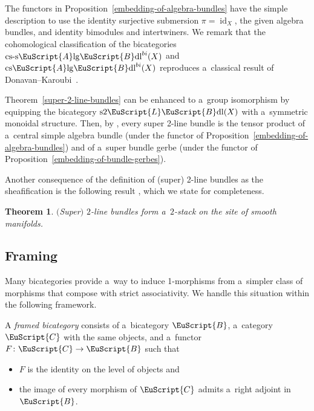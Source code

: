 \documentclass[10pt,a4paper]{amsart}
\numberwithin{equation}{section}
\newtheorem{Theorem}{Theorem}[section]
\def\mathscr#1{\EuScript{#1}}
\newcommand{\id}{\operatorname{id}}
\newcommand{\LineBdl}{\mathscr{L}\mathscr{B}\mathrm{dl}}
\newcommand{\stwoLineBdl}{\mathrm{s}2\LineBdl}
\newcommand{\Alg}{\Incl\mathrm{lg}}
\newcommand{\csAlg}{\mathrm{cs}\Incl\mathrm{lg}}
\newcommand{\cssAlg}{\mathrm{cs\text{-}s}\Alg}
\newcommand{\csAlgBdl}{\csAlg\mathscr{B}\mathrm{dl}}
\newcommand{\cssAlgBdl}{\cssAlg\mathscr{B}\mathrm{dl}}
\newcommand{\Incl}{\mathscr{A}}
\begin{document}
The functors in Proposition~\ref{embedding-of-algebra-bundles} have the simple description to use the identity surjective submersion $\pi=\id_X$, the given algebra bundles, and identity bimodules and intertwiners.
We remark that the cohomological classification of the bicategories $\cssAlgBdl^{bi}(X)$ and $\csAlgBdl^{bi}(X)$ reproduces a~classical result of Donavan--Karoubi~\cite{DK70}.


\begin{Remark}
Theorem~\ref{super-2-line-bundles} can be enhanced to a~group isomorphism by equipping the bicategory $\stwoLineBdl(X)$ with a~symmetric monoidal structure. Then, by \cite[Corollary~4.4.10]{Kristel2020}, every super 2-line bundle is the tensor product of a~central simple algebra bundle (under the functor of Proposition~\ref{embedding-of-algebra-bundles}) and of a~super bundle gerbe (under the functor of Proposition~\ref{embedding-of-bundle-gerbes}).
\end{Remark}

Another consequence of the definition of (super) 2-line bundles as the sheafification is the following result \cite[Theorem~2.3.3]{Kristel2020}, which we state for completeness.

\begin{Theorem}\label{2-line-bundles-form-stack}
$($Super$)$ $2$-line bundles form a~$2$-stack on the site of smooth manifolds.
\end{Theorem}


\subsection{Framing}
\label{framing}

Many bicategories provide a~way to induce 1-morphisms from a~simpler class of morphisms that compose with strict associativity. We handle this situation within the following framework.

\begin{Definition} \label{Definition: framed bicategory}
 A \emph{framed bicategory} consists of a~bicategory $\mathscr{B}$, a~category $\mathscr{C}$ with the same objects,
 and a~functor $F \colon \mathscr{C} \to \mathscr{B}$ such that
 \begin{itemize}\itemsep=0pt
 \item $F$ is the identity on the level of objects and
 \item the image of every morphism of $\mathscr{C}$ admits a~right adjoint in $\mathscr{B}$.
 \end{itemize}
\end{Definition}
\end{document}
